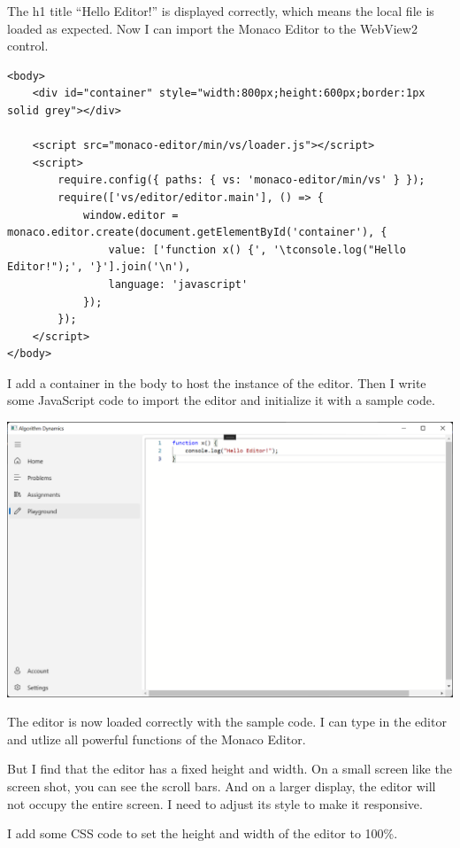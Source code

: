 \documentclass[a4paper]{report}
\begin{document}
The h1 title ``Hello Editor!'' is displayed correctly, which means the local file is loaded as expected. Now I can import the Monaco Editor to the WebView2 control.

\begin{verbatim}
<body>
    <div id="container" style="width:800px;height:600px;border:1px solid grey"></div>

    <script src="monaco-editor/min/vs/loader.js"></script>
    <script>
        require.config({ paths: { vs: 'monaco-editor/min/vs' } });
        require(['vs/editor/editor.main'], () => {
            window.editor = monaco.editor.create(document.getElementById('container'), {
                value: ['function x() {', '\tconsole.log("Hello Editor!");', '}'].join('\n'),
                language: 'javascript'
            });
        });
    </script>
</body>
\end{verbatim}

I add a container in the body to host the instance of the editor. Then I write some JavaScript code to import the editor and initialize it with a sample code.

\includegraphics[width=\textwidth, height=\textheight, keepaspectratio]{PlaygroundPage-WebView2-EditorLoaded}

The editor is now loaded correctly with the sample code. I can type in the editor and utlize all powerful functions of the Monaco Editor.

But I find that the editor has a fixed height and width. On a small screen like the screen shot, you can see the scroll bars. And on a larger display, the editor will not occupy the entire screen. I need to adjust its style to make it responsive.

I add some CSS code to set the height and width of the editor to 100\%.
\end{document}

